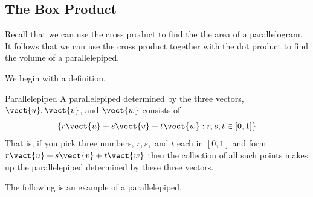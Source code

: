 \subsection{The Box Product}

Recall that we can use the cross product to find the the area of a parallelogram. It follows that we can use the 
cross product together with the dot product to find the volume of a parallelepiped.

We begin with a definition.

\begin{definition}{Parallelepiped}\label{def:parallelepiped}
A parallelepiped
 determined by the three vectors, $\vect{u},\vect{v}$, and $\vect{w}$ consists of
\begin{equation*}
\left\{ r\vect{u}+s\vect{v}+t\vect{w}:r,s,t\in \left[ 0,1\right]
\right\} 
\end{equation*}
That is, if you pick three numbers, $r,s,$ and $t$ each in $\left[ 0,1\right]
$ and form $r\vect{u}+s\vect{v}+t\vect{w}$ then the collection of all
such points makes up the parallelepiped
determined by these three vectors.
\end{definition}

The following is an example of a parallelepiped.

\begin{center}
\end{center}

